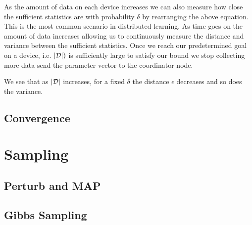 As the amount of data on each device increases we can also measure how close the sufficient statistics are with probability $\delta$ by rearranging the above equation. 
This is the most common scenario in distributed learning. As time goes on the amount of data increases allowing us to continuously measure the distance and variance between the sufficient statistics.
Once we reach our predetermined goal on a device, i.e. $\abs{\mathcal{D}}^^i$ is sufficiently large to satisfy our bound we stop collecting more data send the parameter vector to the coordinator node.


We see that as $\lvert\mathcal{D}\rvert$ increases, for a fixed $\delta$ the distance $\epsilon$ decreases and so does the variance. 

\subsection{Convergence}
\section{Sampling}
\subsection{Perturb and MAP}
\subsection{Gibbs Sampling}
